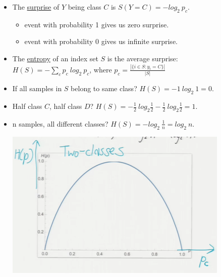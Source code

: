 \documentclass[10pt]{article}
\begin{document}
\begin{itemize}
\begin{itemize}
\begin{itemize}
					\item The \underline{surprise} of $Y$ being class $C$ is $S(Y=C) = -log_{2} \ p_{c}$.
						\begin{itemize}
							\item event with probability 1 gives us zero surprise.
							\item event with probability 0 gives us infinite surprise.
						\end{itemize}
					\item The \underline{entropy} of an index set $S$ is the average surprise: $H(S) = -\sum_{c} p_{c} \ log_{2} \ p_{c}$, where $p_{c} = \frac{|\{i \in S : y_{i} = C\}|}{|S|}$
					\item If all samples in $S$ belong to same class? $H(S) = -1 \ log_{2} \ 1 = 0$.
					\item Half class $C$, half class $D$? $H(S) = -\frac{1}{2} \ log_{2} \frac{1}{2} - \frac{1}{2} \ log_{2} \frac{1}{2} = 1$.
					\item n samples, all different classes? $H(S) = -log_{2} \ \frac{1}{n} = log_{2} \ n$.
					\begin{center}
						\includegraphics[scale=0.7]{../images/entropy}
					\end{center}
				\end{itemize}
				

\end{itemize}
\end{itemize}
\end{document}
